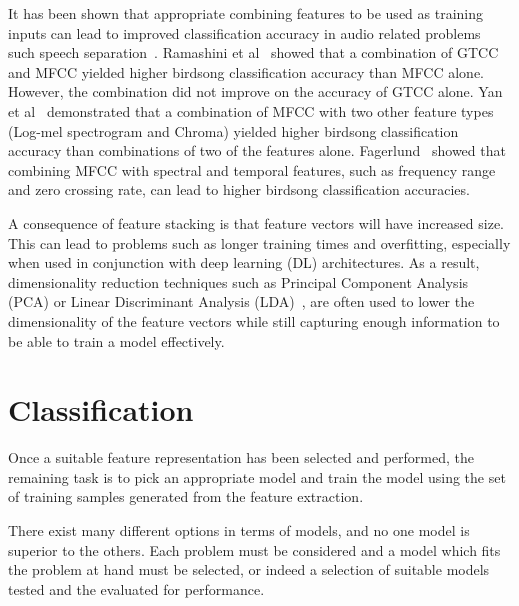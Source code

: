 It has been shown that appropriate combining features to be used as training
inputs can lead to improved classification accuracy in audio related problems
such speech separation~\cite{wang2012exploring}. Ramashini et
al~\cite{ramashini2022robust} showed that a combination of GTCC and MFCC yielded
higher birdsong classification accuracy than MFCC alone. However, the
combination did not improve on the accuracy of GTCC alone. Yan et
al~\cite{yan2021birdsong} demonstrated that a combination of MFCC with two other
feature types (Log-mel spectrogram and Chroma) yielded higher birdsong
classification accuracy than combinations of two of the features alone.
Fagerlund~\cite{fagerlund2007bird} showed that combining MFCC with spectral and
temporal features, such as frequency range and zero crossing rate, can lead to
higher birdsong classification accuracies.

A consequence of feature stacking is that feature vectors will have increased
size. This can lead to problems such as longer training times and overfitting,
especially when used in conjunction with deep learning (DL) architectures. As a
result, dimensionality reduction techniques such as Principal Component
Analysis (PCA) or Linear Discriminant Analysis (LDA)~\cite{ramashini2019bird},
are often used to lower the dimensionality of the feature vectors while still
capturing enough information to be able to train a model effectively.

\section{Classification}\label{sec:classification}

Once a suitable feature representation has been selected and performed, the
remaining task is to pick an appropriate model and train the model using the set
of training samples generated from the feature extraction.

There exist many different options in terms of models, and no one model is
superior to the others. Each problem must be considered and a model which fits
the problem at hand must be selected, or indeed a selection of suitable models
tested and the evaluated for performance.

